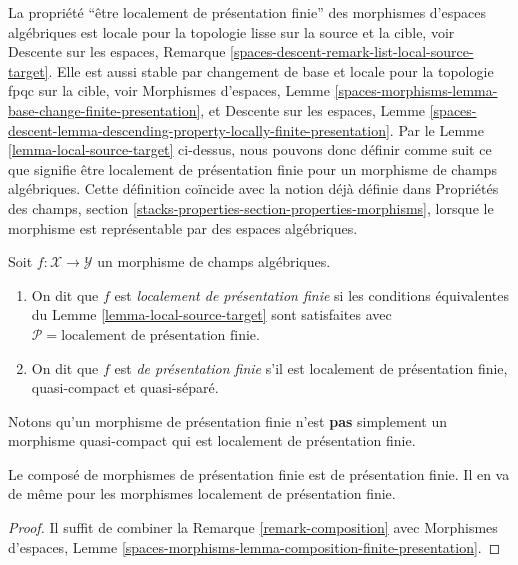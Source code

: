 \noindent
La propriété ``être localement de présentation finie'' des morphismes
d'espaces algébriques est locale pour la topologie lisse sur la source et la
cible, voir Descente sur les espaces, Remarque
\ref{spaces-descent-remark-list-local-source-target}. Elle est aussi stable
par changement de base et locale pour la topologie fpqc sur la cible, voir
Morphismes d'espaces, Lemme
\ref{spaces-morphisms-lemma-base-change-finite-presentation}, et Descente sur
les espaces, Lemme
\ref{spaces-descent-lemma-descending-property-locally-finite-presentation}.
Par le Lemme \ref{lemma-local-source-target} ci-dessus, nous pouvons donc
définir comme suit ce que signifie être localement de présentation finie pour
un morphisme de champs algébriques. Cette définition coïncide avec la notion
déjà définie dans Propriétés des champs,
section \ref{stacks-properties-section-properties-morphisms}, lorsque le
morphisme est représentable par des espaces algébriques.

\begin{definition}
\label{definition-locally-finite-presentation}
Soit $f : \mathcal{X} \to \mathcal{Y}$ un morphisme de champs algébriques.
\begin{enumerate}
\item On dit que $f$ est {\it localement de présentation finie} si les
conditions équivalentes du Lemme \ref{lemma-local-source-target} sont
satisfaites avec
$\mathcal{P} = \text{localement de présentation finie}$.
\item On dit que $f$ est {\it de présentation finie} s'il est localement de
présentation finie, quasi-compact et quasi-séparé.
\end{enumerate}
\end{definition}

\noindent
Notons qu'un morphisme de présentation finie n'est {\bf pas} simplement un
morphisme quasi-compact qui est localement de présentation finie.

\begin{lemma}
\label{lemma-composition-finite-presentation}
Le composé de morphismes de présentation finie est de présentation finie.
Il en va de même pour les morphismes localement de présentation finie.
\end{lemma}

\begin{proof}
Il suffit de combiner la Remarque \ref{remark-composition} avec Morphismes
d'espaces, Lemme
\ref{spaces-morphisms-lemma-composition-finite-presentation}.
\end{proof}

